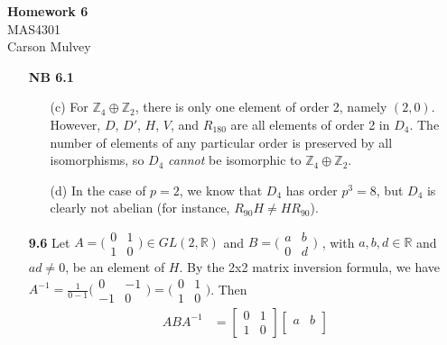 \documentclass[11pt,letterpaper]{article}
\begin{document}
\begin{center}
    \begin{large}
        \textbf{Homework 6} \\
        MAS4301 \\
        Carson Mulvey
    \end{large}
\end{center}

\begin{enumerate}
\item[\textbf{NB 6.1}]
\begin{enumerate}
    \item[(c)] For $\mathbb{Z}_4\oplus \mathbb{Z}_2$, there is only one element of order 2, namely $(2,0)$. However, $D$, $D'$, $H$, $V$, and $R_{180}$ are all elements of order 2 in $D_4$. The number of elements of any particular order is preserved by all isomorphisms, so $D_4$ \textit{cannot} be isomorphic to $\mathbb{Z}_4\oplus \mathbb{Z}_2$.
    \item[(d)] In the case of $p=2$, we know that $D_4$ has order $p^3=8$, but $D_4$ is clearly not abelian (for instance, $R_{90}H\neq HR_{90}$).
\end{enumerate}
\item[\textbf{9.6}] Let $A=
\big(\begin{smallmatrix}
    0 & 1\\
    1 & 0
\end{smallmatrix}\big)\in GL(2,\mathbb{R})$ and $B=
\big(\begin{smallmatrix}
    a & b\\
    0 & d
\end{smallmatrix}\big)$
, with $a,b,d\in \mathbb{R}$ and $ad\neq 0$, be an element of $H$. By the 2x2 matrix inversion formula, we have $A^{-1}= \frac{1}{0-1}
\big(\begin{smallmatrix}
    0 & -1\\
    -1 & 0
\end{smallmatrix}\big) =
\big(\begin{smallmatrix}
   0 & 1\\
   1 & 0
\end{smallmatrix}\big)$. Then
\begin{align*}
    ABA^{-1}
    &=
    \begin{bmatrix}
        0 & 1\\
        1 & 0
    \end{bmatrix}
    \begin{bmatrix}
        a & b\\

\end{bmatrix}
\end{align*}
\end{enumerate}
\end{document}
